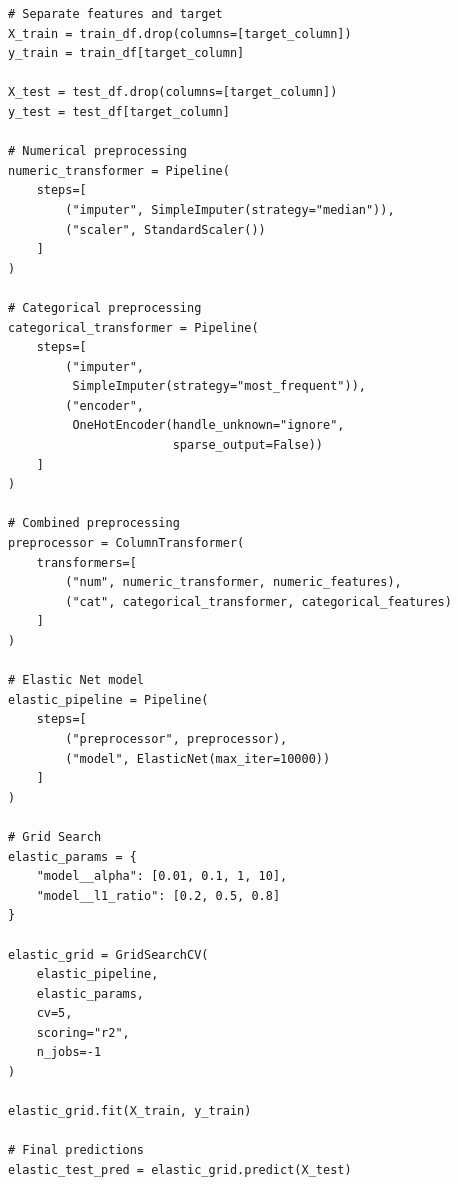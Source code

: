 \documentclass[12pt,a4paper]{article}
\begin{document}
\begin{lstlisting}
# Separate features and target
X_train = train_df.drop(columns=[target_column])
y_train = train_df[target_column]

X_test = test_df.drop(columns=[target_column])
y_test = test_df[target_column]

# Numerical preprocessing
numeric_transformer = Pipeline(
    steps=[
        ("imputer", SimpleImputer(strategy="median")),
        ("scaler", StandardScaler())
    ]
)

# Categorical preprocessing
categorical_transformer = Pipeline(
    steps=[
        ("imputer",
         SimpleImputer(strategy="most_frequent")),
        ("encoder",
         OneHotEncoder(handle_unknown="ignore",
                       sparse_output=False))
    ]
)

# Combined preprocessing
preprocessor = ColumnTransformer(
    transformers=[
        ("num", numeric_transformer, numeric_features),
        ("cat", categorical_transformer, categorical_features)
    ]
)

# Elastic Net model
elastic_pipeline = Pipeline(
    steps=[
        ("preprocessor", preprocessor),
        ("model", ElasticNet(max_iter=10000))
    ]
)

# Grid Search
elastic_params = {
    "model__alpha": [0.01, 0.1, 1, 10],
    "model__l1_ratio": [0.2, 0.5, 0.8]
}

elastic_grid = GridSearchCV(
    elastic_pipeline,
    elastic_params,
    cv=5,
    scoring="r2",
    n_jobs=-1
)

elastic_grid.fit(X_train, y_train)

# Final predictions
elastic_test_pred = elastic_grid.predict(X_test)
\end{lstlisting}
\end{document}
